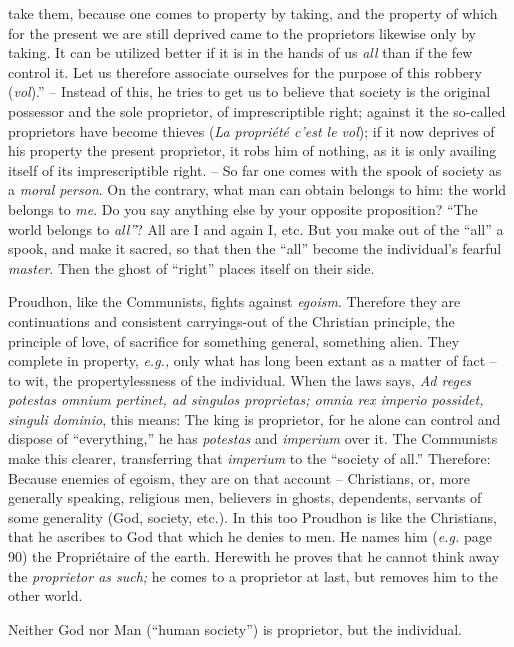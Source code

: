 \documentclass[12pt,a4paper]{book}
\begin{document}
take them, because one comes to property by taking, and the property of which 
for the present we are still deprived came to the proprietors likewise only by 
taking. It can be utilized better if it is in the hands of us \textit{all} 
than if the few control it. Let us therefore associate ourselves for the 
purpose of this robbery (\textit{vol}).'' -- Instead of this, he tries to get 
us to believe that society is the original possessor and the sole proprietor, 
of imprescriptible right; against it the so-called proprietors have become 
thieves (\textit{La propri\'et\'e c'est le vol}); if it now deprives of his 
property the present proprietor, it robs him of nothing, as it is only 
availing itself of its imprescriptible right. -- So far one comes with the 
spook of society as a \textit{moral person}. On the contrary, what man can 
obtain belongs to him: the world belongs to \textit{me}. Do you say anything 
else by your opposite proposition? ``The world belongs to \textit{all''}? 
All are I and again I, etc. But you make out of the ``all'' a spook, and 
make it sacred, so that then the ``all'' become the individual's fearful 
\textit{master}. Then the ghost of ``right'' places itself on their side.

Proudhon, like the Communists, fights against \textit{egoism}. Therefore they 
are continuations and consistent carryings-out of the Christian principle, the 
principle of love, of sacrifice for something general, something alien. They 
complete in property, \textit{e.g.,} only what has long been extant as a 
matter of fact -- to wit, the propertylessness of the individual. When the 
laws says, \textit{Ad reges potestas omnium pertinet, ad singulos proprietas; 
omnia rex imperio possidet, singuli dominio}, this means: The king is 
proprietor, for he alone can control and dispose of ``everything,'' he has 
\textit{potestas} and \textit{imperium} over it. The Communists make this 
clearer, transferring that \textit{imperium} to the ``society of all.'' 
Therefore: Because enemies of egoism, they are on that account -- Christians, 
or, more generally speaking, religious men, believers in ghosts, dependents, 
servants of some generality (God, society, etc.). In this too Proudhon is like 
the Christians, that he ascribes to God that which he denies to men. He names 
him (\textit{e.g.} page 90) the Propri\'etaire of the earth. Herewith he 
proves that he cannot think away the \textit{proprietor as such;} he comes to 
a proprietor at last, but removes him to the other world.

Neither God nor Man (``human society'') is proprietor, but the individual.
\end{document}
